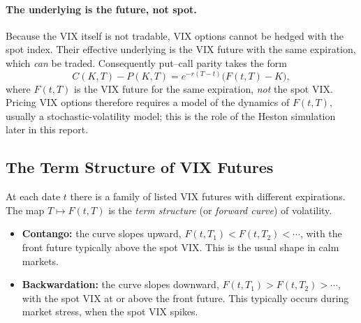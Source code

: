 \paragraph{The underlying is the future, not spot.} Because the VIX itself is not tradable, VIX options cannot be hedged with the spot index. Their effective underlying is the VIX future with the same expiration, which \emph{can} be traded. Consequently put--call parity takes the form
\begin{equation}
  C(K,T) - P(K,T) = e^{-r(T-t)}\big(F(t,T)-K\big),
  \label{eq:vix-pcp}
\end{equation}
where $F(t,T)$ is the VIX future for the same expiration, \emph{not} the spot VIX. Pricing VIX options therefore requires a model of the dynamics of $F(t,T)$, usually a stochastic-volatility model; this is the role of the Heston simulation later in this report.

\subsection{The Term Structure of VIX Futures}
\label{sec:term-structure}

At each date $t$ there is a family of listed VIX futures with different expirations. The map $T\mapsto F(t,T)$ is the \emph{term structure} (or \emph{forward curve}) of volatility.

\begin{itemize}
  \item \textbf{Contango:} the curve slopes upward, $F(t,T_1) < F(t,T_2) < \cdots$, with the front future typically above the spot VIX. This is the usual shape in calm markets.
  \item \textbf{Backwardation:} the curve slopes downward, $F(t,T_1) > F(t,T_2) > \cdots$, with the spot VIX at or above the front future. This typically occurs during market stress, when the spot VIX spikes.
\end{itemize}


